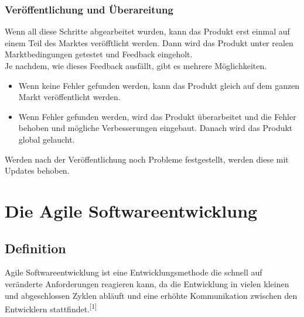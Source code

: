 \documentclass[a4paper, 10pt]{scrartcl}
\begin{document}
\subsubsection{Veröffentlichung und Überareitung}
Wenn all diese Schritte abgearbeitet wurden, kann das Produkt erst einmal auf einem Teil des Marktes veröfftlicht werden. Dann wird das Produkt unter realen Marktbedingungen getestet und Feedback eingeholt.\\
Je nachdem, wie dieses Feedback ausfällt, gibt es mehrere Möglichkeiten. 
\begin{itemize}
\item Wenn keine Fehler gefunden werden, kann das Produkt gleich auf dem ganzen Markt veröffentlicht werden.
\item Wenn Fehler gefunden werden, wird das Produkt überarbeitet und die Fehler behoben und mögliche Verbesserungen eingebaut. Danach wird das Produkt global gelaucht.
\end{itemize}
Werden nach der Veröffentlichung noch Probleme festgestellt, werden diese mit Updates behoben.


\section{Die Agile Softwareentwicklung}
\subsection{Definition}
\begin{center}
\large{\glqq{} Agile Softwareentwicklung ist eine Entwicklungsmethode die schnell auf veränderte Anforderungen reagieren kann, da die Entwicklung in vielen kleinen und abgeschlossen Zyklen abläuft und eine erhöhte Kommunikation zwischen den Entwicklern stattfindet.\grqq{}}\textsuperscript{[1]} \\
\end{center}
\end{document}
